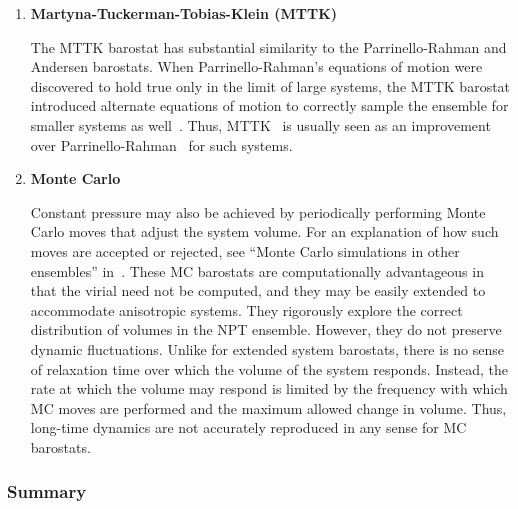 \documentclass[9pt,bestpractices]{livecoms}
\begin{document}
\begin{enumerate}[listparindent=\parindent]
    \item \textbf{Martyna-Tuckerman-Tobias-Klein (MTTK)}

        The MTTK barostat has substantial similarity to the Parrinello-Rahman and Andersen barostats.
        When Parr\-inello-Rah\-man's equations of motion were discovered to hold true only in the limit of large systems, the MTTK barostat introduced alternate equations of motion to correctly sample the ensemble for smaller systems as well~\cite{martyna1994constant, martyna1996explicit}.
        Thus, MTTK~\cite{martyna1994constant, martyna1996explicit} is usually seen as an improvement over Parrinello-Rahman~\cite{Parrinello1981} for such systems.

    \item \textbf{Monte Carlo}

        Constant pressure may also be achieved by periodically performing Monte Carlo moves that adjust the system volume.
        For an explanation of how such moves are accepted or rejected, see ``Monte Carlo simulations in other ensembles'' in~\citet{ShellNotes}.
        These MC barostats are computationally advantageous in that the virial need not be computed, and they may be easily extended to accommodate anisotropic systems.
        They rigorously explore the correct distribution of volumes in the NPT ensemble.
         However, they do not preserve dynamic fluctuations.
        Unlike for extended system barostats, there is no sense of relaxation time over which the volume of the system responds.
        Instead, the rate at which the volume may respond is limited by the frequency with which MC moves are performed and the maximum allowed change in volume.
        Thus, long-time dynamics are not accurately reproduced in any sense for MC barostats.

\end{enumerate}

\subsubsection{Summary}
\end{document}
